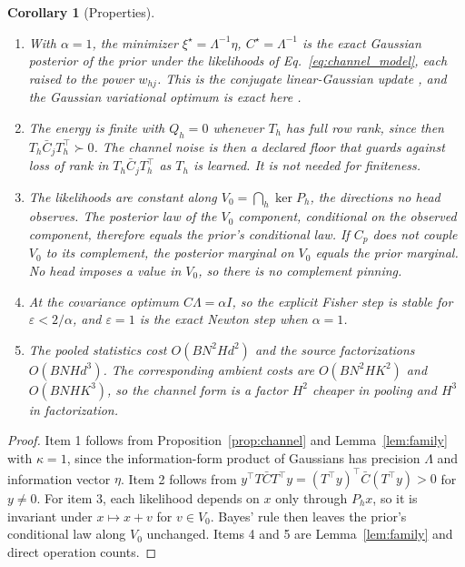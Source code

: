 \documentclass[11pt]{article}
\newtheorem{corollary}[proposition]{Corollary}
\theoremstyle{definition}
\theoremstyle{remark}
\begin{document}
\begin{corollary}[Properties]
\label{cor:channel}
\begin{enumerate}
\item With $\alpha=1$, the minimizer $\xi^\star=\Lambda^{-1}\eta$, $C^\star=\Lambda^{-1}$ is the exact Gaussian posterior of the prior under the likelihoods of Eq.~\eqref{eq:channel_model}, each raised to the power $w_{hj}$. This is the conjugate linear-Gaussian update \citep[Sec.~2.3.3]{bishop2006prml}, and the Gaussian variational optimum is exact here \citep{opper2009variational}.
\item The energy is finite with $Q_h=0$ whenever $T_h$ has full row rank, since then $T_h\bar C_jT_h^\top\succ0$. The channel noise is then a declared floor that guards against loss of rank in $T_h\bar C_jT_h^\top$ as $T_h$ is learned. It is not needed for finiteness.
\item The likelihoods are constant along $V_0=\bigcap_h\ker P_h$, the directions no head observes. The posterior law of the $V_0$ component, conditional on the observed component, therefore equals the prior's conditional law. If $C_p$ does not couple $V_0$ to its complement, the posterior marginal on $V_0$ equals the prior marginal. No head imposes a value in $V_0$, so there is no complement pinning.
\item At the covariance optimum $C\Lambda=\alpha I$, so the explicit Fisher step is stable for $\varepsilon<2/\alpha$, and $\varepsilon=1$ is the exact Newton step when $\alpha=1$.
\item The pooled statistics cost $O(BN^2Hd^2)$ and the source factorizations $O(BNHd^3)$. The corresponding ambient costs are $O(BN^2HK^2)$ and $O(BNHK^3)$, so the channel form is a factor $H^2$ cheaper in pooling and $H^3$ in factorization.
\end{enumerate}
\end{corollary}

\begin{proof}
Item 1 follows from Proposition~\ref{prop:channel} and Lemma~\ref{lem:family} with $\kappa=1$, since the information-form product of Gaussians has precision $\Lambda$ and information vector $\eta$. Item 2 follows from $y^\top T\bar CT^\top y=(T^\top y)^\top\bar C(T^\top y)>0$ for $y\ne0$. For item 3, each likelihood depends on $x$ only through $P_hx$, so it is invariant under $x\mapsto x+v$ for $v\in V_0$. Bayes' rule then leaves the prior's conditional law along $V_0$ unchanged. Items 4 and 5 are Lemma~\ref{lem:family} and direct operation counts.
\end{proof}
\end{document}
